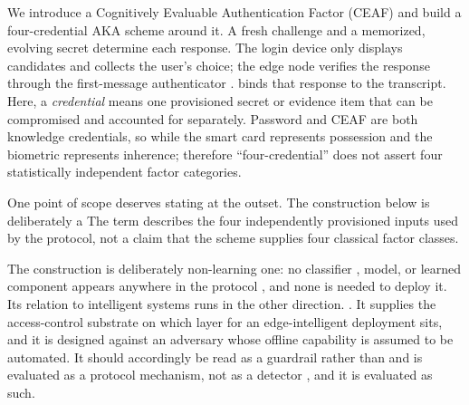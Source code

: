 \documentclass[cmc,article,submit,moreauthors,pdftex]{Definitions/tsp}
\providecommand{\DIFadd}[1]{{\protect\color{blue} \sf #1}} %
\providecommand{\DIFdel}[1]{{\protect\color{red} \scriptsize #1}} %
\providecommand{\DIFaddbegin}{} %
\providecommand{\DIFaddend}{} %
\providecommand{\DIFdelbegin}{} %
\providecommand{\DIFdelend}{} %
\begin{document}
We introduce a Cognitively Evaluable Authentication Factor (CEAF) and build a four-credential AKA scheme around it. A fresh challenge and a memorized, evolving secret determine each response. The login device \DIFdelbegin \DIFdel{only }\DIFdelend displays candidates and collects the user's choice; the \DIFdelbegin \DIFdel{edge node verifies the response through the }\DIFdelend first-message authenticator \DIFdelbegin \DIFdel{. }\DIFdelend \DIFaddbegin \DIFadd{binds that response to the transcript. Here, a \emph{credential} means one provisioned secret or evidence item that can be compromised and accounted for separately. }\DIFaddend Password and CEAF are both knowledge credentials, \DIFdelbegin \DIFdel{so }\DIFdelend \DIFaddbegin \DIFadd{while the smart card represents possession and the biometric represents inherence; therefore }\DIFaddend ``four-credential'' does not assert four \DIFaddbegin \DIFadd{statistically }\DIFaddend independent factor categories. \DIFdelbegin %

\DIFdel{One point of scope deserves stating at the outset.
The construction below is deliberately a }\DIFdelend \DIFaddbegin \DIFadd{The term describes the four independently provisioned inputs used by the protocol, not a claim that the scheme supplies four classical factor classes.
}

\DIFadd{The construction is deliberately }\DIFaddend non-learning\DIFdelbegin \DIFdel{one}\DIFdelend : no classifier \DIFdelbegin \DIFdel{, model, }\DIFdelend or learned component appears \DIFdelbegin \DIFdel{anywhere }\DIFdelend in the protocol\DIFdelbegin \DIFdel{, and none is needed to deploy it. Its relation to intelligent systems runs in the other direction. }\DIFdelend \DIFaddbegin \DIFadd{. }\DIFaddend It supplies the access-control \DIFdelbegin \DIFdel{substrate on which }\DIFdelend \DIFaddbegin \DIFadd{layer for }\DIFaddend an edge-intelligent deployment \DIFdelbegin \DIFdel{sits, and it is designed against an adversary whose offline capability is assumed to be automated. It should accordingly be read as a guardrail rather than }\DIFdelend \DIFaddbegin \DIFadd{and is evaluated as a protocol mechanism, not }\DIFaddend as a detector\DIFdelbegin \DIFdel{, and it is evaluated as such}\DIFdelend .
\end{document}
